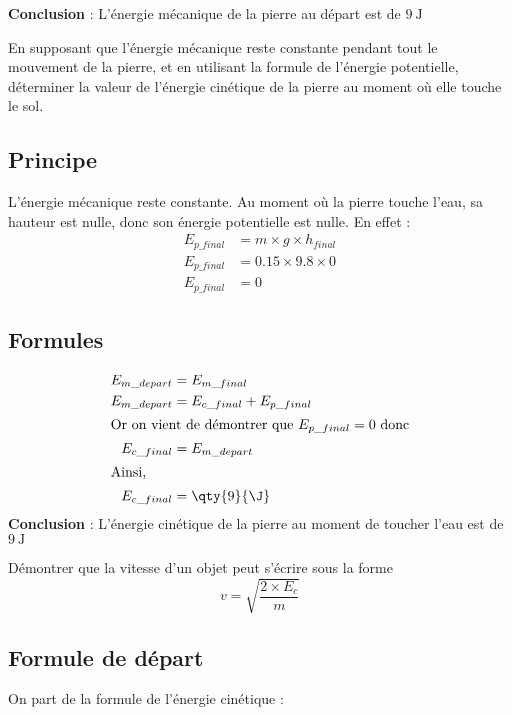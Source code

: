 \documentclass[answers]{exam}
\begin{document}
\begin{questions}
\begin{solution}
\textbf{Conclusion} : L’énergie mécanique de la pierre au départ est de \(\SI{9}{\joule}\)
\end{solution}

\question[1] En supposant que l'énergie mécanique reste constante pendant tout le mouvement de la pierre, et en utilisant la formule de l'énergie potentielle, déterminer la valeur de l'énergie cinétique de la pierre au moment où elle touche le sol.

\begin{solution}


  \subsection*{Principe}
  L’énergie mécanique reste constante. Au moment où la pierre touche l’eau, sa hauteur est nulle, donc son énergie potentielle est nulle. En effet : 
  \begin{align*}
    E_{p\_final} &= m \times g \times h_{final} \\
    E_{p\_final} &= 0.15 \times 9.8 \times 0 \\
    E_{p\_final} &= 0
  \end{align*}
  
  \subsection*{Formules}
  \begin{align*}
  E_{m\_depart} &= E_{m\_final} \\
  E_{m\_depart} &= E_{c\_final} + E_{p\_final} \\
  \intertext{Or on vient de démontrer que $E_{p\_final} = 0$ donc}
  E_{c\_final} &= E_{m\_depart} \\
  \intertext{Ainsi, }
  E_{c\_final} &= \qty{9}{\J}
  \end{align*}
\textbf{Conclusion} : L’énergie cinétique de la pierre au moment de toucher l’eau est de \(\SI{9}{\joule}\)
\end{solution}

\question[1] Démontrer que la vitesse d'un objet peut s'écrire sous la forme 
\[
v = \sqrt{\frac{2 \times E_c}{m}}
\]

\begin{solution}

\subsection*{Formule de départ}
On part de la formule de l’énergie cinétique :


\end{solution}
\end{questions}
\end{document}
